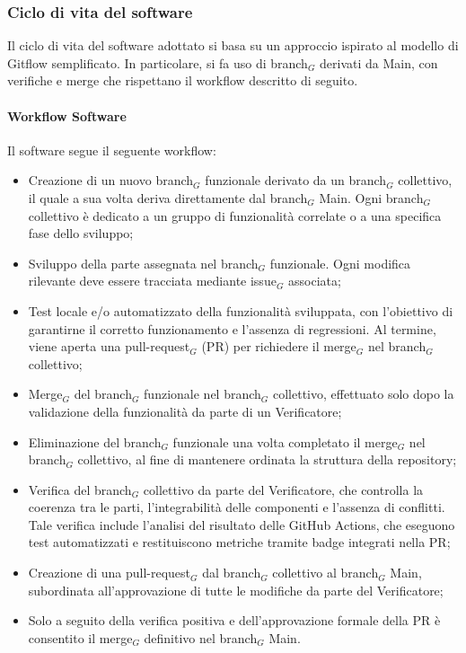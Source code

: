 \documentclass[10pt]{article}
\begin{document}
\begin{justify}
    \subsubsection{Ciclo di vita del software}
    Il ciclo di vita del software adottato si basa su un approccio ispirato al modello di Gitflow semplificato.
    In particolare, si fa uso di branch$_G$ derivati da Main, con verifiche e merge che rispettano il workflow descritto di seguito.

    \paragraph{Workflow Software}
    Il software segue il seguente workflow:
    \begin{itemize}
        \item Creazione di un nuovo branch$_G$ funzionale derivato da un branch$_G$ collettivo, il quale a sua volta deriva direttamente dal branch$_G$ Main. Ogni branch$_G$ collettivo è dedicato a un gruppo di funzionalità correlate o a una specifica fase dello sviluppo;
        \item Sviluppo della parte assegnata nel branch$_G$ funzionale. Ogni modifica rilevante deve essere tracciata mediante issue$_G$ associata;
        \item Test locale e/o automatizzato della funzionalità sviluppata, con l'obiettivo di garantirne il corretto funzionamento e l'assenza di regressioni. Al termine, viene aperta una pull-request$_G$ (PR) per richiedere il merge$_G$ nel branch$_G$ collettivo;
        \item Merge$_G$ del branch$_G$ funzionale nel branch$_G$ collettivo, effettuato solo dopo la validazione della funzionalità da parte di un Verificatore;
        \item Eliminazione del branch$_G$ funzionale una volta completato il merge$_G$ nel branch$_G$ collettivo, al fine di mantenere ordinata la struttura della repository;
        \item Verifica del branch$_G$ collettivo da parte del Verificatore, che controlla la coerenza tra le parti, l'integrabilità delle componenti e l'assenza di conflitti. Tale verifica include l'analisi del risultato delle GitHub Actions, che eseguono test automatizzati e restituiscono metriche tramite badge integrati nella PR;
        \item Creazione di una pull-request$_G$ dal branch$_G$ collettivo al branch$_G$ Main, subordinata all’approvazione di tutte le modifiche da parte del Verificatore;
        \item Solo a seguito della verifica positiva e dell'approvazione formale della PR è consentito il merge$_G$ definitivo nel branch$_G$ Main.
    \end{itemize}


\end{justify}
\end{document}
